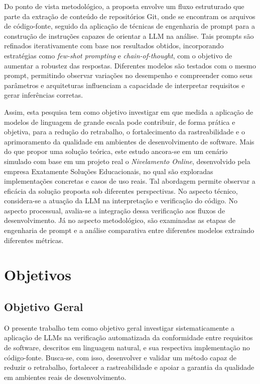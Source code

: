 Do ponto de vista metodológico, a proposta envolve um fluxo estruturado que parte da extração de conteúdo de repositórios Git, onde se encontram os arquivos de código-fonte, seguido da aplicação de técnicas de engenharia de prompt para a construção de instruções capazes de orientar a LLM na análise. Tais prompts são refinados iterativamente com base nos resultados obtidos, incorporando estratégias como \textit{few-shot prompting} e \textit{chain-of-thought}, com o objetivo de aumentar a robustez das respostas. Diferentes modelos são testados com o mesmo prompt, permitindo observar variações no desempenho e compreender como seus parâmetros e arquiteturas influenciam a capacidade de interpretar requisitos e gerar inferências corretas.

Assim, esta pesquisa tem como objetivo investigar em que medida a aplicação de modelos de linguagem de grande escala pode contribuir, de forma prática e objetiva, para a redução do retrabalho, o fortalecimento da rastreabilidade e o aprimoramento da qualidade em ambientes de desenvolvimento de software. Mais do que propor uma solução teórica, este estudo ancora-se em um cenário simulado com base em um projeto real o \textit{Nivelamento Online}, desenvolvido pela empresa Exatamente Soluções Educacionais, no qual são exploradas implementações concretas e casos de uso reais. Tal abordagem permite observar a eficácia da solução proposta sob diferentes perspectivas. No aspecto técnico, considera-se a atuação da LLM na interpretação e verificação do código. No aspecto processual, avalia-se a integração dessa verificação aos fluxos de desenvolvimento. Já no aspecto metodológico, são examinadas as etapas de engenharia de prompt e a análise comparativa entre diferentes modelos extraindo diferentes métricas.

\section{Objetivos}

\subsection{Objetivo Geral}
O presente trabalho tem como objetivo geral investigar sistematicamente a aplicação de LLMs na verificação automatizada da conformidade entre requisitos de software, descritos em linguagem natural, e sua respectiva implementação no código-fonte. Busca-se, com isso, desenvolver e validar um método capaz de reduzir o retrabalho, fortalecer a rastreabilidade e apoiar a garantia da qualidade em ambientes reais de desenvolvimento.

